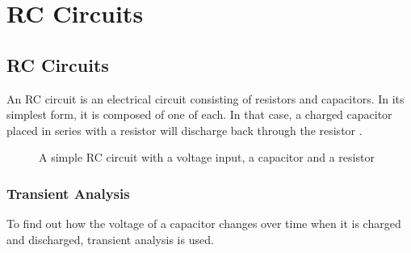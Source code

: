\chapter{RC Circuits} \label{chap:RC}
\section{RC Circuits}
An RC circuit is an electrical circuit consisting of resistors and capacitors. In its simplest form, it is composed of one of each. In that case, a charged capacitor placed in series with a resistor will discharge back through the resistor \cite[p~21]{artof}. 

\begin{figure}[H]
 
 \caption{A simple RC circuit with a voltage input, a capacitor and a resistor}
\end{figure}
\subsection{Transient Analysis}
\label{sec371}
To find out how the voltage of a capacitor changes over time when it is charged and discharged, transient analysis is used.

